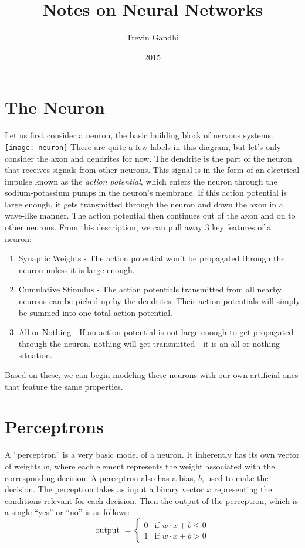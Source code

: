 \documentclass{article}
\title{Notes on Neural Networks}
\author{Trevin Gandhi}
\date{2015}
\begin{document}
\maketitle

\section{The Neuron}
	Let us first consider a neuron, the basic building block of nervous systems. \\
	\texttt{[image: neuron]}
	There are quite a few labels in this diagram, but let's only consider the axon and dendrites for now. The dendrite is the part of the neuron that receives signals from other neurons. This signal is in the form of an electrical impulse known as the \textit{action potential}, which enters the neuron through the sodium-potassium pumps in the neuron's membrane. If this action potential is large enough, it gets transmitted through the neuron and down the axon in a wave-like manner. The action potential then continues out of the axon and on to other neurons. From this description, we can pull away 3 key features of a neuron: \\
	\begin{enumerate}
		\item Synaptic Weights - The action potential won't be propagated through the neuron unless it is large enough.
		\item Cumulative Stimulus - The action potentials transmitted from all nearby neurons can be picked up by the dendrites. Their action potentials will simply be summed into one total action potential.
		\item All or Nothing - If an action potential is not large enough to get propagated through the neuron, nothing will get transmitted - it is an all or nothing situation.
	\end{enumerate}
	Based on these, we can begin modeling these neurons with our own artificial ones that feature the same properties.

\section{Perceptrons}
	A ``perceptron'' is a very basic model of a neuron. It inherently has its own vector of weights $w$, where each element represents the weight associated with the corresponding decision.  A perceptron also has a bias, $b$, used to make the decision. The perceptron takes as input a binary vector $x$ representing the conditions relevant for each decision. Then the output of the perceptron, which is a single ``yes'' or ``no'' is as follows:
	\begin{equation}
	\text{output } = \begin{cases} 0 &\mbox{if } w \cdot x + b \leq 0 \\
					          1 &\mbox{if } w \cdot x + b > 0 \end{cases}
	\end{equation}
\end{document}
